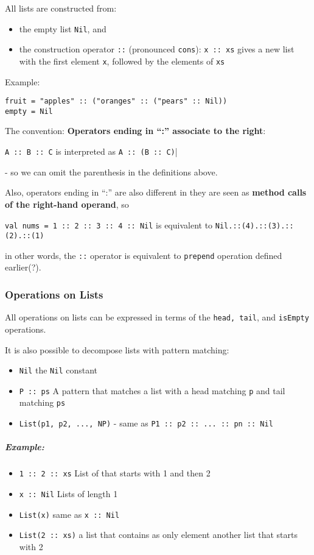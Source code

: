 \documentclass{scrartcl}
\newcommand{\example}{\subparagraph{Example:}} %
\newcommand{\term}[1]{\verb~#1~} %
\begin{document}
All lists are constructed from:
\begin{itemize}
\item the empty list \lstinline|Nil|, and
\item the construction operator \lstinline|::| (pronounced \term{cons}):
\lstinline|x :: xs| gives a new list with the first element \lstinline|x|,
followed by the elements of \lstinline|xs|
\end{itemize}
Example:
\begin{lstlisting}
fruit = "apples" :: ("oranges" :: ("pears" :: Nil))
empty = Nil
\end{lstlisting}
The convention: {\bf Operators ending in ``:'' associate to the right}:

\lstinline|A :: B :: C| is interpreted as \lstinline|A :: (B :: C)|| 

- so we can omit the parenthesis in the definitions above.

Also, operators ending in ``:'' are also different in they are seen as {\bf
  method calls of the right-hand operand}, so

\lstinline|val nums = 1 :: 2 :: 3 :: 4 :: Nil| is equivalent to
\lstinline|Nil.::(4).::(3).::(2).::(1)|

in other words, the \lstinline|::| operator is equivalent to \lstinline|prepend|
operation defined earlier(?).

\subsubsection{Operations on Lists}
\label{sec:OprationsOnLists}

All operations on lists can be expressed in terms of the \lstinline|head, tail|,
and \lstinline|isEmpty| operations.

It is also possible to decompose lists with pattern matching:
\begin{itemize}
\item \lstinline|Nil| the \lstinline|Nil| constant
\item \lstinline|P :: ps| A pattern that matches a list with a head matching
  \lstinline|p| and tail matching \lstinline|ps|
\item \lstinline|List(p1, p2, ..., NP)| - same as
 \lstinline|P1 :: p2 :: ... :: pn :: Nil|
\end{itemize}
\example 
\begin{itemize}
\item \lstinline|1 :: 2 :: xs| List of that starts with 1 and then 2
\item \lstinline|x :: Nil| Lists of length 1
\item \lstinline|List(x)| same as \lstinline|x :: Nil|
\item \lstinline|List(2 :: xs)| a list that contains as only element another
  list that starts with 2
\end{itemize}
\end{document}

